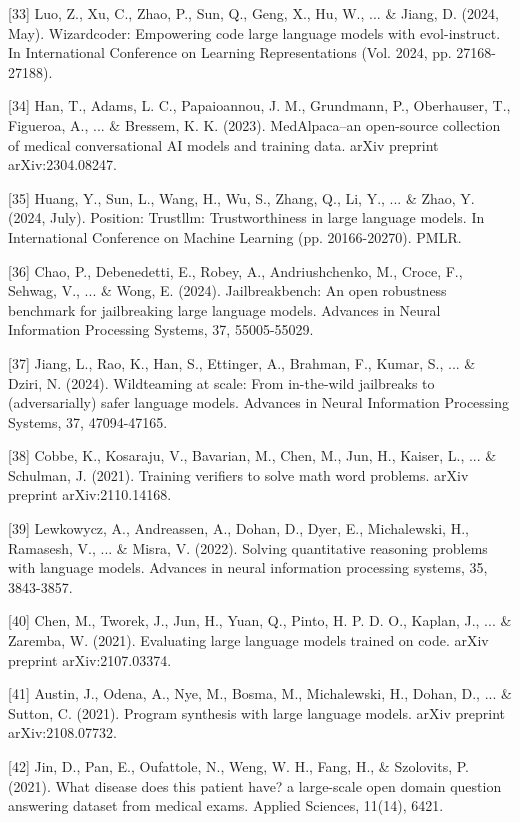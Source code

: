 [33] Luo, Z., Xu, C., Zhao, P., Sun, Q., Geng, X., Hu, W., ... \& Jiang, D. (2024, May). Wizardcoder: Empowering code large language models with evol-instruct. In International Conference on Learning Representations (Vol. 2024, pp. 27168-27188).

[34] Han, T., Adams, L. C., Papaioannou, J. M., Grundmann, P., Oberhauser, T., Figueroa, A., ... \& Bressem, K. K. (2023). MedAlpaca--an open-source collection of medical conversational AI models and training data. arXiv preprint arXiv:2304.08247.

[35] Huang, Y., Sun, L., Wang, H., Wu, S., Zhang, Q., Li, Y., ... \& Zhao, Y. (2024, July). Position: Trustllm: Trustworthiness in large language models. In International Conference on Machine Learning (pp. 20166-20270). PMLR.

[36] Chao, P., Debenedetti, E., Robey, A., Andriushchenko, M., Croce, F., Sehwag, V., ... \& Wong, E. (2024). Jailbreakbench: An open robustness benchmark for jailbreaking large language models. Advances in Neural Information Processing Systems, 37, 55005-55029.

[37] Jiang, L., Rao, K., Han, S., Ettinger, A., Brahman, F., Kumar, S., ... \& Dziri, N. (2024). Wildteaming at scale: From in-the-wild jailbreaks to (adversarially) safer language models. Advances in Neural Information Processing Systems, 37, 47094-47165.

[38] Cobbe, K., Kosaraju, V., Bavarian, M., Chen, M., Jun, H., Kaiser, L., ... \& Schulman, J. (2021). Training verifiers to solve math word problems. arXiv preprint arXiv:2110.14168.

[39] Lewkowycz, A., Andreassen, A., Dohan, D., Dyer, E., Michalewski, H., Ramasesh, V., ... \& Misra, V. (2022). Solving quantitative reasoning problems with language models. Advances in neural information processing systems, 35, 3843-3857.

[40] Chen, M., Tworek, J., Jun, H., Yuan, Q., Pinto, H. P. D. O., Kaplan, J., ... \& Zaremba, W. (2021). Evaluating large language models trained on code. arXiv preprint arXiv:2107.03374.

[41] Austin, J., Odena, A., Nye, M., Bosma, M., Michalewski, H., Dohan, D., ... \& Sutton, C. (2021). Program synthesis with large language models. arXiv preprint arXiv:2108.07732.

[42] Jin, D., Pan, E., Oufattole, N., Weng, W. H., Fang, H., \& Szolovits, P. (2021). What disease does this patient have? a large-scale open domain question answering dataset from medical exams. Applied Sciences, 11(14), 6421.

